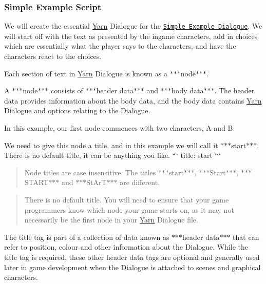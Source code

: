 \subsubsection*{Simple Example Script}

We will create the essential \hyperlink{a00045}{Yarn} Dialogue for the \href{../Unity/Assets/YarnSpinner/Examples/DemoAssets/SimpleExampleScript.yarn.txt}{\tt Simple Example Dialogue}. We will start off with the text as presented by the ingame characters, add in choices which are essentially what the player says to the characters, and have the characters react to the choices.

Each section of text in \hyperlink{a00045}{Yarn} Dialogue is known as a $\ast$$\ast$$\ast$node$\ast$$\ast$$\ast$.

A $\ast$$\ast$$\ast$node$\ast$$\ast$$\ast$ consists of $\ast$$\ast$$\ast$header data$\ast$$\ast$$\ast$ and $\ast$$\ast$$\ast$body data$\ast$$\ast$$\ast$. The header data provides information about the body data, and the body data contains \hyperlink{a00045}{Yarn} Dialogue and options relating to the Dialogue.

In this example, our first node commences with two characters, A and B.

We need to give this node a title, and in this example we will call it $\ast$$\ast$$\ast$start$\ast$$\ast$$\ast$. There is no default title, it can be anything you like. ``` title\-: start ```

\begin{quotation}
Node titles are case insensitive. The titles $\ast$$\ast$$\ast$start$\ast$$\ast$$\ast$, $\ast$$\ast$$\ast$\-Start$\ast$$\ast$$\ast$, $\ast$$\ast$$\ast$\-S\-T\-A\-R\-T$\ast$$\ast$$\ast$ and $\ast$$\ast$$\ast$\-St\-Ar\-T$\ast$$\ast$$\ast$ are different.

\end{quotation}


\begin{quotation}
There is no default title. You will need to ensure that your game programmers know which node your game starts on, as it may not necessarily be the first node in your \hyperlink{a00045}{Yarn} Dialogue file.

\end{quotation}


The title tag is part of a collection of data known as $\ast$$\ast$$\ast$header data$\ast$$\ast$$\ast$ that can refer to position, colour and other information about the Dialogue. While the title tag is required, these other header data tags are optional and generally used later in game development when the Dialogue is attached to scenes and graphical characters.

